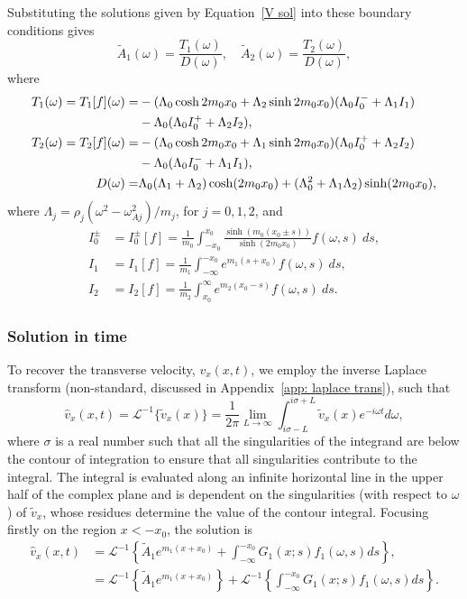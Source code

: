Substituting the solutions given by Equation~\eqref{V sol} into these boundary conditions gives
\begin{equation}
\tilde{A}_1(\omega) = \frac{T_1(\omega)}{D(\omega)}, \quad \tilde{A}_2(\omega) = \frac{T_2(\omega)}{D(\omega)},
\end{equation}
where
\begin{align}
T_1(\omega) = T_1[f](\omega) = & -(\Lambda_0\cosh{2m_0 x_0} + \Lambda_2\sinh{2m_0 x_0})(\Lambda_0 I_0^- + \Lambda_1 I_1) \notag \\
& - \Lambda_0(\Lambda_0 I_0^+ + \Lambda_2 I_2), \\
T_2(\omega) = T_2[f](\omega) = & - (\Lambda_0\cosh{2m_0 x_0} + \Lambda_1\sinh{2m_0 x_0})(\Lambda_0 I_0^+ + \Lambda_2 I_2) \notag \\
& -\Lambda_0(\Lambda_0 I_0^- + \Lambda_1 I_1), \\
D(\omega) = & \Lambda_0(\Lambda_1 + \Lambda_2)\cosh(2m_0x_0) + (\Lambda_0^2 + \Lambda_1\Lambda_2)\sinh(2m_0x_0),
\label{D}
\end{align}
where $\Lambda_j = \rho_j (\omega^2 - \omega_{Aj}^2) /  m_j$, for $j = 0, 1, 2$, and
\begin{align}
I_0^\pm &= I_0^\pm[f] = \frac{1}{m_0} \int_{-x_0}^{x_0} \frac{\sinh(m_0(x_0 \pm s))}{\sinh(2m_0x_0)} f(\omega, s) ~ds, \\
I_1 &= I_1[f] = \frac{1}{m_1} \int_{-\infty}^{-x_0} e^{m_1(s + x_0)} f(\omega, s) ~ds, \\
I_2 &= I_2[f] = \frac{1}{m_2} \int_{x_0}^\infty e^{m_2(x_0 - s)} f(\omega, s) ~ds.
\end{align}


\subsubsection{Solution in time}

To recover the transverse velocity, $v_x(x, t)$, we employ the inverse Laplace transform (non-standard, discussed in Appendix~\ref{app: laplace trans}), such that
\begin{equation}
\widehat{v}_x(x,t) = \mathcal{L}^{-1}\{\tilde{v}_x(x)\} = \frac{1}{2\pi} \lim_{L \to \infty} \int_{i\sigma - L}^{i\sigma + L} \tilde{v}_x(x) e^{-i\omega t} d\omega,
\label{laplace transform}
\end{equation}
where $\sigma$ is a real number such that all the singularities of the integrand are below the contour of integration to ensure that all singularities contribute to the integral. The integral is evaluated along an infinite horizontal line in the upper half of the complex plane and is dependent on the singularities (with respect to $\omega$) of $\tilde{v}_x$, whose residues determine the value of the contour integral. Focusing firstly on the region $x < -x_0$, the solution is
\begin{align}
\widehat{v}_x(x, t) &= \mathcal{L}^{-1} \left\{ \tilde{A}_1 e^{m_1(x + x_0)} + \int_{-\infty}^{-x_0} G_1(x; s)f_1(\omega, s)ds \right\}, \\
&= \mathcal{L}^{-1} \left\{ \tilde{A}_1 e^{m_1(x + x_0)} \right\} + \mathcal{L}^{-1} \left\{ \int_{-\infty}^{-x_0} G_1(x; s)f_1(\omega, s)ds \right\}.
\label{vx sol inv LPT}
\end{align}

